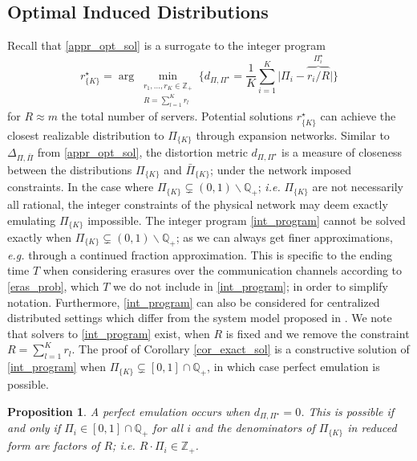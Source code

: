 \documentclass[journal,letterpaper,onecolumn,twoside,nofonttune]{IEEEtran}
\newcommand{\Z}{\mathbb{Z}}
\newcommand{\Q}{\mathbb{Q}}
\newcommand{\Pib}{\bar{\Pi}}
\newcommand{\Pis}{\Pi^{\star}}
\newtheorem{Prop}{Proposition}
\begin{document}
\subsection{Optimal Induced Distributions}
\label{opt_ind_distr_subsec}

Recall that \eqref{appr_opt_sol} is a surrogate to the integer program
\begin{equation}
\label{int_program}
  r^{\star}_{\{K\}}=\arg\min_{\substack{r_1,\ldots,r_K\in\Z_+\\ R=\sum_{l=1}^Kr_l}} \bigg\{d_{\Pi,\Pis}=\frac{1}{K}\sum_{i=1}^K\big|\Pi_i-\overbrace{r_i/R}^{\Pis_i}\big|\bigg\}
\end{equation}
for $R\approx m$ the total number of servers. Potential solutions $r^{\star}_{\{K\}}$ can achieve the closest realizable distribution to $\Pi_{\{K\}}$ through expansion networks. Similar to $\Delta_{\Pi,\Pib}$ from \eqref{appr_opt_sol}, the distortion metric $d_{\Pi,\Pis}$ is a measure of closeness between the distributions $\Pi_{\{K\}}$ and $\Pib_{\{K\}}$; under the network imposed constraints. In the case where $\Pi_{\{K\}}\subsetneq(0,1)\backslash\Q_+$; \textit{i.e.} $\Pi_{\{K\}}$ are not necessarily all rational, the integer constraints of the physical network may deem exactly emulating $\Pi_{\{K\}}$ impossible. The integer program \eqref{int_program} cannot be solved exactly when $\Pi_{\{K\}}\subsetneq(0,1)\backslash\Q_+$; as we can always get finer approximations, \textit{e.g.} through a continued fraction approximation. This is specific to the ending time $T$ when considering erasures over the communication channels according to \eqref{eras_prob}, which $T$ we do not include in \eqref{int_program}; in order to simplify notation. Furthermore, \eqref{int_program} can also be considered for centralized distributed settings which differ from the system model proposed in \cite{LLPPR17}. We note that solvers to \eqref{int_program} exist, when $R$ is fixed and we remove the constraint $R=\sum_{l=1}^Kr_l$. The proof of Corollary \ref{cor_exact_sol} is a constructive solution of \eqref{int_program} when $\Pi_{\{K\}}\subsetneq[0,1]\cap\Q_+$, in which case perfect emulation is possible.%

\begin{Prop}
\label{perf_emulation_prop}
A perfect emulation occurs when $d_{\Pi,\Pis}=0$. This is possible if and only if $\Pi_i\in[0,1]\cap\Q_+$ for all $i$ and the denominators of $\Pi_{\{K\}}$ in reduced form are factors of $R$; \textit{i.e.} $R\cdot\Pi_i\in\Z_+$.
\end{Prop}
\end{document}
